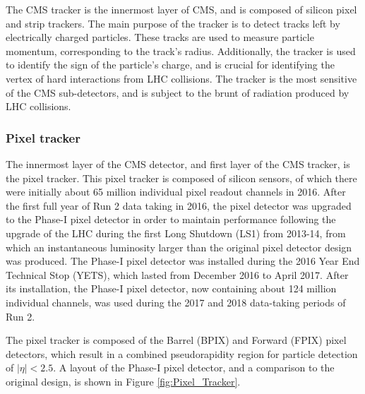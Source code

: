 The CMS tracker is the innermost layer of CMS, and is composed of silicon pixel and strip trackers. The main purpose of the tracker is to detect tracks left by electrically charged particles. These tracks are used to measure particle momentum, corresponding to the track's radius. Additionally, the tracker is used to identify the sign of the particle's charge, and is crucial for identifying the vertex of hard interactions from LHC collisions. The tracker is the most sensitive of the CMS sub-detectors, and is subject to the brunt of radiation produced by LHC collisions.  

\subsubsection{Pixel tracker} \label{sec:PIXEL}

The innermost layer of the CMS detector, and first layer of the CMS tracker, is the pixel tracker. This pixel tracker is composed of silicon sensors, of which there were initially about 65 million individual pixel readout channels in 2016. After the first full year of Run 2 data taking in 2016, the pixel detector was upgraded to the Phase-I pixel detector \cite{PhaseI_Pixel} in order to maintain performance following the upgrade of the LHC during the first Long Shutdown (LS1) from 2013-14, from which an instantaneous luminosity larger than the original pixel detector design was produced. The Phase-I pixel detector was installed during the 2016 Year End Technical Stop (YETS), which lasted from December 2016 to April 2017. After its installation, the Phase-I pixel detector, now containing about 124 million individual channels, was used during the 2017 and 2018 data-taking periods of Run 2.

The pixel tracker is composed of the Barrel (BPIX) and Forward (FPIX) pixel detectors, which result in a combined pseudorapidity region for particle detection of $|\eta| < 2.5$. A layout of the Phase-I pixel detector, and a comparison to the original design, is shown in Figure \ref{fig:Pixel_Tracker}. 


